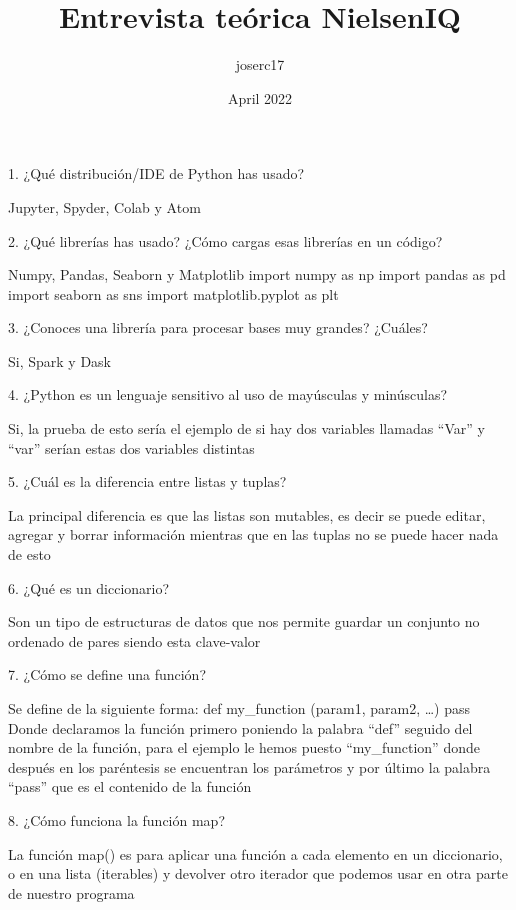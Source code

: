 \documentclass{article}
\title{Entrevista teórica NielsenIQ}
\author{joserc17 }
\date{April 2022}
\begin{document}
\maketitle

1. ¿Qué distribución/IDE de Python has usado?


Jupyter, Spyder, Colab y Atom


2. ¿Qué librerías has usado? ¿Cómo cargas esas librerías en un código?


Numpy, Pandas, Seaborn y Matplotlib
import numpy as np
import pandas as pd
import seaborn as sns
import matplotlib.pyplot as plt


3. ¿Conoces una librería para procesar bases muy grandes? ¿Cuáles?


Si, Spark y Dask


4. ¿Python es un lenguaje sensitivo al uso de mayúsculas y minúsculas?


Si, la prueba de esto sería el ejemplo de si hay dos variables llamadas “Var” y 
“var” serían estas dos variables distintas


5. ¿Cuál es la diferencia entre listas y tuplas?


La principal diferencia es que las listas son mutables, es decir se puede editar, 
agregar y borrar información mientras que en las tuplas no se puede hacer nada 
de esto 


6. ¿Qué es un diccionario?


Son un tipo de estructuras de datos que nos permite guardar un conjunto no 
ordenado de pares siendo esta clave-valor


7. ¿Cómo se define una función?


Se define de la siguiente forma:
def my_function (param1, param2, …)
pass
Donde declaramos la función primero poniendo la palabra “def” seguido del 
nombre de la función, para el ejemplo le hemos puesto “my_function” donde 
después en los paréntesis se encuentran los parámetros y por último la palabra 
“pass” que es el contenido de la función 


8. ¿Cómo funciona la función map?


La función map() es para aplicar una función a cada elemento en un diccionario, o 
en una lista (iterables) y devolver otro iterador que podemos usar en otra parte de 
nuestro programa
\end{document}

